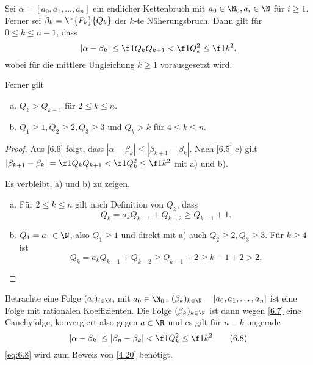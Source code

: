\begin{st} \label{6.7}
	Sei $\alpha = [a_0, a_1, \dotsc, a_n]$ ein endlicher Kettenbruch mit $a_0 \in \N_0, a_i \in \N$ für $i \ge 1$.
	Ferner sei $\beta_k = \f {P_k}{Q_k}$ der $k$-te Näherungsbruch.
	Dann gilt für $0 \le k \le n-1$, dass
	\[
		| \alpha - \beta_k | \le \f 1{Q_k Q_{k+1}} < \f 1{Q_k^2} \le \f 1{k^2},
	\]
	wobei für die mittlere Ungleichung $k \ge 1$ vorausgesetzt wird.

	Ferner gilt
	\begin{enumerate}[a)]
		\item
			$Q_k > Q_{k-1}$ für $2 \le k \le n$.
		\item
			$Q_1 \ge 1, Q_2 \ge 2, Q_3 \ge 3$ und $Q_k > k$ für $4 \le k \le n$.
	\end{enumerate}
	\begin{proof}
		Aus \ref{6.6} folgt, dass $|\alpha - \beta_k| \le |\beta_{k+1} - \beta_k|$.
		Nach \ref{6.5} c) gilt $|\beta_{k+1} - \beta_k| = \f 1{Q_k Q_{k+1}} < \f 1{Q_k^2} \le \f 1{k^2}$ mit a) und b).

		Es verbleibt, a) und b) zu zeigen.
		\begin{enumerate}[a)]
			\item
				Für $2 \le k \le n$ gilt nach Definition von $Q_k$, dass
				\[
					Q_k = a_k Q_{k-1} + Q_{k-2}
					\ge Q_{k-1} + 1.
				\]
			\item
				$Q_1 = a_1 \in \N$, also $Q_1 \ge 1$ und direkt mit a) auch $Q_2 \ge 2, Q_3 \ge 3$.
				Für $k \ge 4$ ist
				\[
					Q_k = a_k Q_{k-1} + Q_{k-2}
					\ge Q_{k-1} + 2
					\ge k - 1 + 2
					> 2.
				\]
		\end{enumerate}
	\end{proof}
\end{st}

Betrachte eine Folge $(a_i)_{i \in \N}$, mit $a_0 \in \N_0$.
$(\beta_k)_{k\in\N} = [a_0, a_1, \dotsc, a_n]$ ist eine Folge mit rationalen Koeffizienten.
Die Folge $(\beta_k)_{k \in \N}$ ist dann wegen \ref{6.7} eine Cauchyfolge, konvergiert also gegen $a \in \R$ und es gilt für $n - k$ ungerade
\begin{equation}
	\label{eq:6.8}
	|\alpha - \beta_k| \le | \beta_n - \beta_k| < \f 1{Q_k^2} \le \f 1{k^2}
	\tag{6.8}
\end{equation}
\eqref{eq:6.8} wird zum Beweis von \ref{4.20} benötigt.


